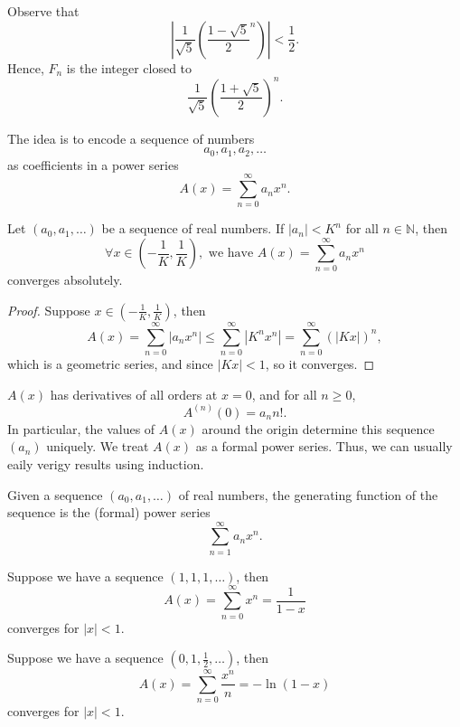 Observe that 
\[
    \left\vert \frac{1}{\sqrt{5} } \left( \frac{1 - \sqrt{5} }{2}^n \right)  \right\vert < \frac{1}{2} .
\]
Hence, \(F_n\) is the integer closed to 
\[
    \frac{1}{\sqrt{5} } \left( \frac{1 + \sqrt{5} }{2} \right)^n. 
\] 

The idea is to encode a sequence of numbers 
\[
    a_0, a_1, a_2, \dots 
\]
as coefficients in a power series 
\[
    A(x) = \sum_{n=0}^{\infty} a_n x^n. 
\]

\begin{proposition}
    Let \((a_0, a_1, \dots )\) be a sequence of real numbers. If \(\vert a_n \vert < K^n \) for all \(n \in \mathbb{N} \), then
    \[
        \forall x \in \left( -\frac{1}{K}, \frac{1}{K} \right), \text{ we have } A(x) = \sum_{n=0}^{\infty} a_n x^n  
    \]  converges absolutely.
\end{proposition}
\begin{proof}
    Suppose \(x \in \left( -\frac{1}{K}, \frac{1}{K} \right) \), then 
    \[
        A(x) = \sum_{n=0}^{\infty} \left\vert a_n x^n \right\vert \le \sum_{n=0}^{\infty} \left\vert K^n x^n \right\vert = \sum_{n=0}^{\infty} \left( \left\vert Kx \right\vert  \right)^n,     
    \] which is a geometric series, and since \(\left\vert Kx \right\vert < 1 \), so it converges. 
\end{proof}

\(A(x)\) has derivatives of all orders at \(x = 0\), and for all \(n \ge 0\), 
    \[
        A^{(n)}(0) = a_n n!.
    \]  In particular, the values of \(A(x)\) around the origin determine this sequence \((a_n)\) uniquely. We treat \(A(x)\) as a formal power series.  Thus, we can usually eaily verigy results using induction. 

\begin{definition}
    Given a sequence \((a_0, a_1, \dots )\) of real numbers, the generating function of the sequence is the (formal) power series 
    \[
        \sum_{n=1}^{\infty} a_n x^n.  
    \]
\end{definition}

\begin{eg}
    Suppose we have a sequence \((1, 1, 1, \dots )\), then 
    \[
        A(x) = \sum_{n=0}^{\infty} x^n = \frac{1}{1-x} 
    \] converges for \(\vert x \vert < 1 \).  
\end{eg}

\begin{eg}
    Suppose we have a sequence \(\left( 0, 1, \frac{1}{2}, \dots  \right) \), then 
    \[
        A(x) = \sum_{n=0}^{\infty} \frac{x^n}{n} = -\ln (1 - x) 
    \] converges for \(\vert x \vert < 1 \).  
\end{eg}

